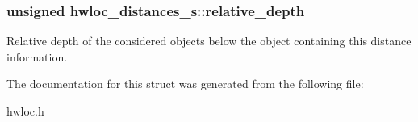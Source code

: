 \hypertarget{a00014_a6fe066eaf62ee448aa05bab8e7217ff7}{
\subsubsection[{relative\_\-depth}]{\setlength{\rightskip}{0pt plus 5cm}unsigned {\bf hwloc\_\-distances\_\-s::relative\_\-depth}}}
\label{a00014_a6fe066eaf62ee448aa05bab8e7217ff7}


Relative depth of the considered objects below the object containing this distance information. 



The documentation for this struct was generated from the following file:\begin{DoxyCompactItemize}
\item 
hwloc.h\end{DoxyCompactItemize}
